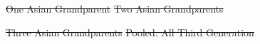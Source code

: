 \documentclass[12pt,english]{article}
\providecommand{\DIFdeltex}[1]{{\protect\color{red}\sout{#1}}}                      %
\providecommand{\DIFdelFL}[1]{\DIFdel{#1}} %
\providecommand{\DIFdel}[1]{\texorpdfstring{\DIFdeltex{#1}}{}} %
\begin{document}
{%
\DIFdelFL{One Asian Grandparent}}
{%
\DIFdelFL{Two Asian Grandparents}}


{%
\DIFdelFL{Three Asian Grandparents}}
{%
\DIFdelFL{Pooled: All Third Generation}}

\end{document}
